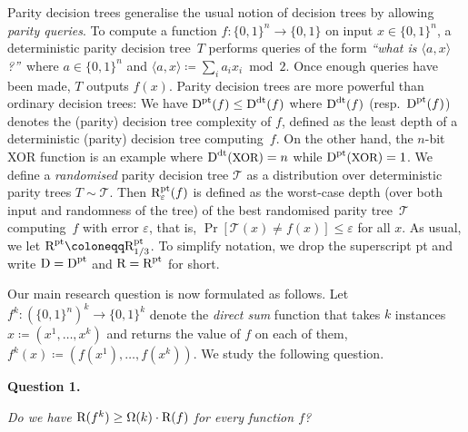 Parity decision trees generalise the usual notion of decision trees by allowing \emph{parity queries}. To compute a function $f\colon\{0,1\}^{n}\to\{0,1\}$ on input $x\in\{0,1\}^{n}$, a deterministic parity decision tree $T$ performs queries of the form \emph{“what is $\langle a,x\rangle$?”} where $a\in\{0,1\}^{n}$ and $\langle a,x\rangle\coloneqq{\sum_{i}a_{i}x_{i}\bmod 2}$. Once enough queries have been made, $T$ outputs $f(x)$. Parity decision trees are more powerful than ordinary decision trees: We have ${\textup{D}}^{\textup{pt}}(f)\leq{\textup{D}}^{\textup{dt}}(f)$ where ${\textup{D}}^{\textup{dt}}(f)$ (resp. ${\textup{D}}^{\textup{pt}}(f)$) denotes the (parity) decision tree complexity of $f$, defined as the least depth of a deterministic (parity) decision tree computing $f$. On the other hand, the $n$-bit XOR function is an example where ${\textup{D}}^{\textup{dt}}({\textrm{\small{XOR}}})=n$ while ${\textup{D}}^{\textup{pt}}({\textrm{\small{XOR}}})=1$. We define a \emph{randomised} parity decision tree $\mathcal{T}$ as a distribution over deterministic parity trees $T\sim\mathcal{T}$. Then ${\textup{R}}^{\textup{pt}}_{\varepsilon}(f)$ is defined as the worst-case depth (over both input and randomness of the tree) of the best randomised parity tree $\mathcal{T}$ computing $f$ with error $\varepsilon$, that is, $\Pr[\mathcal{T}(x)\neq f(x)]\leq\varepsilon$ for all $x$. As usual, we let ${\textup{R}}^{\textup{pt}}\coloneqq\smash{{\textup{R}}^{\textup{pt}}_{1/3}}$. To simplify notation, we drop the superscript pt and write ${\textup{D}}={\textup{D}}^{\textup{pt}}$ and ${\textup{R}}={\textup{R}}^{\textup{pt}}$ for short.\par




Our main research question is now formulated as follows. Let $f^{k}\colon(\{0,1\}^{n})^{k}\to\{0,1\}^{k}$ denote the \emph{direct sum} function that takes $k$ instances $x\coloneqq(x^{1},\dots,x^{k})$ and returns the value of $f$ on each of them, $f^{k}(x)\coloneqq(f(x^{1}),\dots,f(x^{k}))$. We study the following question.\par





\par\medskip\noindent\textbf{
\textbf{Question 1}\textbf{.}
}\par



\emph{Do we have ${\textup{R}}(f^{k})\geq\Omega(k)\cdot{\textup{R}}(f)$ for every function $f$?}\par



